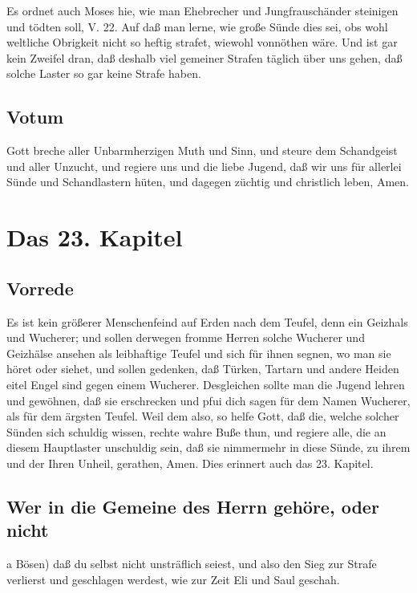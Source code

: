 Es ordnet auch Moses hie, wie man Ehebrecher und Jungfrauschänder steinigen und tödten soll, V. 22. Auf daß man lerne, wie große Sünde dies sei, obs wohl weltliche Obrigkeit nicht so heftig strafet, wiewohl vonnöthen wäre. Und ist gar kein Zweifel dran, daß deshalb viel gemeiner Strafen täglich über uns gehen, daß solche Laster so gar keine Strafe haben.

\section{Votum}

Gott breche aller Unbarmherzigen Muth und Sinn, und steure dem Schandgeist und aller Unzucht, und regiere uns und die liebe Jugend, daß wir uns für allerlei Sünde und Schandlastern hüten, und dagegen züchtig und christlich leben, Amen.

\chapter{Das 23. Kapitel}

\section{Vorrede}

Es ist kein größerer Menschenfeind auf Erden nach dem Teufel, denn ein Geizhals und Wucherer; und sollen derwegen fromme Herren solche Wucherer und Geizhälse ansehen als leibhaftige Teufel und sich für ihnen segnen, wo man sie höret oder siehet, und sollen gedenken, daß Türken, Tartarn und andere Heiden eitel Engel sind gegen einem Wucherer. Desgleichen sollte man die Jugend lehren und gewöhnen, daß sie erschrecken und pfui dich sagen für dem Namen Wucherer, als für dem ärgsten Teufel. Weil dem also, so helfe Gott, daß die, welche solcher Sünden sich schuldig wissen, rechte wahre Buße thun, und regiere alle, die an diesem Hauptlaster unschuldig sein, daß sie nimmermehr in diese Sünde, zu ihrem und der Ihren Unheil, gerathen, Amen. Dies erinnert auch das 23. Kapitel.

\section{Wer in die Gemeine des Herrn gehöre, oder nicht}

a Bösen) daß du selbst nicht unsträflich seiest, und also den Sieg zur Strafe verlierst und geschlagen werdest, wie zur Zeit Eli und Saul geschah.

